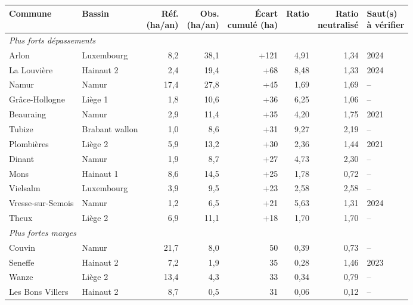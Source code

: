 \begin{tabular}{llrrrrrl}
\toprule
Commune & Bassin & \makecell{Réf.\\(ha/an)} & \makecell{Obs.\\(ha/an)} & \makecell{Écart\\cumulé (ha)} & Ratio & \makecell{Ratio\\neutralisé} & \makecell{Saut(s)\\à vérifier} \\
\midrule
\multicolumn{8}{l}{\emph{Plus forts dépassements}} \\
\quad Arlon & Luxembourg & 8{,}2 & 38{,}1 & +121 & 4{,}91 & 1{,}34 & 2024 \\
\quad La Louvière & Hainaut 2 & 2{,}4 & 19{,}4 & +68 & 8{,}48 & 1{,}33 & 2024 \\
\quad Namur & Namur & 17{,}4 & 27{,}8 & +45 & 1{,}69 & 1{,}69 & -- \\
\quad Grâce-Hollogne & Liège 1 & 1{,}8 & 10{,}6 & +36 & 6{,}25 & 1{,}06 & -- \\
\quad Beauraing & Namur & 2{,}9 & 11{,}4 & +35 & 4{,}20 & 1{,}75 & 2021 \\
\quad Tubize & Brabant wallon & 1{,}0 & 8{,}6 & +31 & 9{,}27 & 2{,}19 & -- \\
\quad Plombières & Liège 2 & 5{,}9 & 13{,}2 & +30 & 2{,}36 & 1{,}44 & 2021 \\
\quad Dinant & Namur & 1{,}9 & 8{,}7 & +27 & 4{,}73 & 2{,}30 & -- \\
\quad Mons & Hainaut 1 & 8{,}6 & 14{,}5 & +25 & 1{,}78 & 0{,}72 & -- \\
\quad Vielsalm & Luxembourg & 3{,}9 & 9{,}5 & +23 & 2{,}58 & 2{,}58 & -- \\
\quad Vresse-sur-Semois & Namur & 1{,}2 & 6{,}5 & +21 & 5{,}63 & 1{,}31 & 2024 \\
\quad Theux & Liège 2 & 6{,}9 & 11{,}1 & +18 & 1{,}70 & 1{,}70 & -- \\
\multicolumn{8}{l}{\emph{Plus fortes marges}} \\
\quad Couvin & Namur & 21{,}7 & 8{,}0 & \textminus{}50 & 0{,}39 & 0{,}73 & -- \\
\quad Seneffe & Hainaut 2 & 7{,}2 & \textminus{}1{,}9 & \textminus{}35 & \textminus{}0{,}28 & 1{,}46 & 2023 \\
\quad Wanze & Liège 2 & 13{,}4 & 4{,}3 & \textminus{}33 & 0{,}34 & 0{,}79 & -- \\
\quad Les Bons Villers & Hainaut 2 & 8{,}7 & 0{,}5 & \textminus{}31 & 0{,}06 & 0{,}12 & -- \\

\end{tabular}
